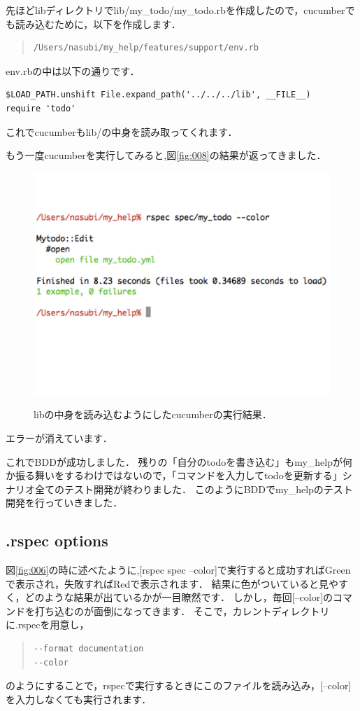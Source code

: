 先ほどlibディレクトリでlib/my\_todo/my\_todo.rbを作成したので，cucumberでも読み込むために，以下を作成します．
\begin{quote}\begin{verbatim}
/Users/nasubi/my_help/features/support/env.rb
\end{verbatim}\end{quote}
env.rbの中は以下の通りです．
\begin{lstlisting}[style=customRuby,basicstyle={\scriptsize\ttfamily}]
$LOAD_PATH.unshift File.expand_path('../../../lib', __FILE__)
require 'todo'
\end{lstlisting}
これでcucumberもlib/の中身を読み取ってくれます．

もう一度cucumberを実行してみると,図\ref{fig:008}の結果が返ってきました．

\begin{figure}[htbp]\begin{center}
\includegraphics[width=12cm,bb= 0 0 937 753]{../figs/./my_help_nasu.008.jpeg}
\caption{libの中身を読み込むようにしたcucumberの実行結果．}
\label{fig:008}
\label{default}\end{center}\end{figure}
エラーが消えています．

これでBDDが成功しました．
残りの「自分のtodoを書き込む」もmy\_helpが何か振る舞いをするわけではないので，「コマンドを入力してtodoを更新する」シナリオ全てのテスト開発が終わりました．
このようにBDDでmy\_helpのテスト開発を行っていきました．

\subsection{.rspec options}
図\ref{fig:006}の時に述べたように,[rspec spec --color]で実行すると成功すればGreenで表示され，失敗すればRedで表示されます．
結果に色がついていると見やすく，どのような結果が出ているかが一目瞭然です．
しかし，毎回[--color]のコマンドを打ち込むのが面倒になってきます．
そこで，カレントディレクトリに.rspecを用意し，
\begin{quote}\begin{verbatim}
--format documentation
--color
\end{verbatim}\end{quote}
のようにすることで，rspecで実行するときにこのファイルを読み込み，[--color]を入力しなくても実行されます．

